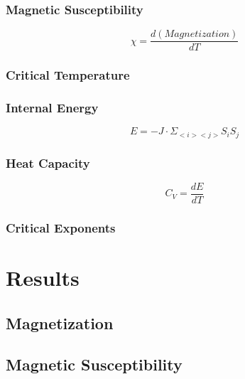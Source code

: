 \documentclass[letterpaper,12pt]{article}
\numberwithin{equation}{subsection}
\begin{document}
\subsubsection{Magnetic Susceptibility}
\begin{equation}
\chi = \dfrac{d(Magnetization)}{dT}
\end{equation}
\subsubsection{Critical Temperature}
\subsubsection{Internal Energy}
\begin{equation}
E = - J \cdot \Sigma_{<i><j>} S_i S_j
\end{equation}
\subsubsection{Heat Capacity}
\begin{equation}
C_V = \dfrac{dE}{dT}
\end{equation}
\subsubsection{Critical Exponents}

\newpage
\section{Results}
\subsection{Magnetization}
\subsection{Magnetic Susceptibility}
\end{document}
